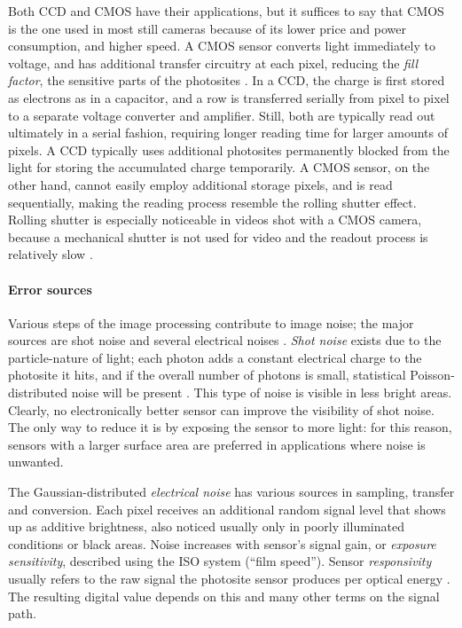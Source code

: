 Both CCD and CMOS have their applications, but it suffices to say that CMOS is the one used in most still cameras because of its lower price and power consumption, and higher speed.
A CMOS sensor converts light immediately to voltage, and has additional transfer circuitry at each pixel, reducing the \emph{fill factor}, the sensitive parts of the photosites \cite[p. 62]{nakamura2005image}.
In a CCD, the charge is first stored as electrons as in a capacitor, and a row is transferred serially from pixel to pixel to a separate voltage converter and amplifier.
Still, both are typically read out ultimately in a serial fashion, requiring longer reading time for larger amounts of pixels.
A CCD typically uses additional photosites permanently blocked from the light for storing the accumulated charge temporarily.
A CMOS sensor, on the other hand, cannot easily employ additional storage pixels, and is read sequentially, making the reading process resemble the rolling shutter effect.
Rolling shutter is especially noticeable in videos shot with a CMOS camera, because a mechanical shutter is not used for video and the readout process is relatively slow \cite{taylor1998ccd,caspeelectronic}.

\paragraph{Error sources}
Various steps of the image processing contribute to image noise; the major sources are shot noise and several electrical noises \cite{szeliski10vision,litwiller2001ccd}.
\emph{Shot noise} exists due to the particle-nature of light; each photon adds a constant electrical charge to the photosite it hits, and if the overall number of photons is small, statistical Poisson-distributed noise will be present \cite[p. 74]{nakamura2005image}.
This type of noise is visible in less bright areas.
Clearly, no electronically better sensor can improve the visibility of shot noise.
The only way to reduce it is by exposing the sensor to more light: for this reason, sensors with a larger surface area are preferred in applications where noise is unwanted.

The Gaussian-distributed \emph{electrical noise} has various sources in sampling, transfer and conversion.
Each pixel receives an additional random signal level that shows up as additive brightness, also noticed usually only in poorly illuminated conditions or black areas.
Noise increases with sensor's signal gain, or \emph{exposure sensitivity}, described using the ISO system (``film speed'').
Sensor \emph{responsivity} usually refers to the raw signal the photosite sensor produces per optical energy \cite[p. 78]{nakamura2005image}.
The resulting digital value depends on this and many other terms on the signal path.

